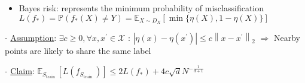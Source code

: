 

\begin{itemize}
  \item Bayes risk: represents the minimum probability of misclassification
  $
  L\left(f_{*}\right)=\mathbb{P}\left(f_{*}(X) \neq Y\right)=\mathbb{E}_{X \sim D_{X}}[\min \{\eta(X), 1-\eta(X)\}]
  $
\end{itemize}




- \underline{Assumption}: $\exists c \geq 0, \forall x, x^{\prime} \in \mathscr{X}$ :
$
\left|\eta(x)-\eta\left(x^{\prime}\right)\right| \leq c\left\|x-x^{\prime}\right\|_{2}
$
$\Rightarrow$ Nearby points are likely to share the same label

- \underline{Claim}:
$
\mathbb{E}_{S_{\text {train }}}\left[L\left(f_{S_{\text {train }}}\right)\right] 
\leq 2 L\left(f_{*}\right)+4 c \sqrt{d} N^{-\frac{1}{d+1}}
$

